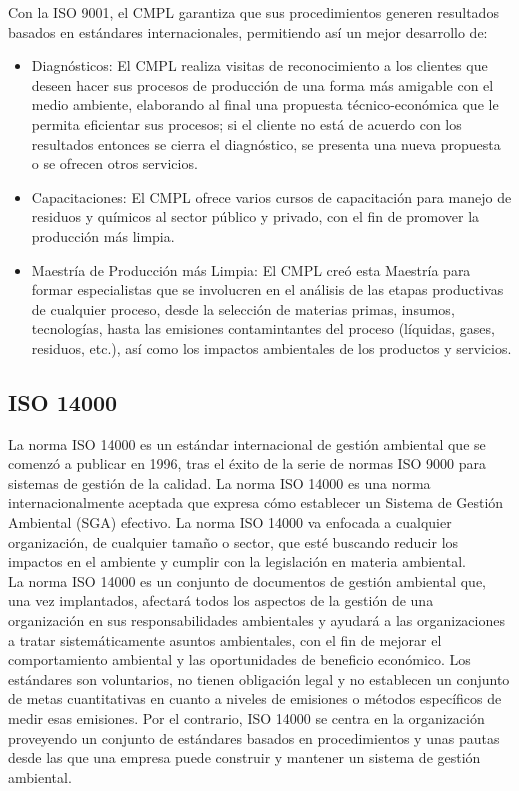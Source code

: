 	Con la ISO 9001, el CMPL garantiza que sus procedimientos generen resultados basados en estándares internacionales, permitiendo así un mejor desarrollo de:\\

	\begin{itemize}
		\item Diagnósticos: El CMPL realiza visitas de reconocimiento a los clientes que deseen hacer sus procesos de producción de una forma más amigable con el medio ambiente, elaborando al final una propuesta técnico-económica que le permita eficientar sus procesos; si el cliente no está de acuerdo con los resultados entonces se cierra el diagnóstico, se presenta una nueva propuesta o se ofrecen otros servicios.
		\item Capacitaciones: El CMPL ofrece varios cursos de capacitación para manejo de residuos y químicos al sector público y privado, con el fin de promover la producción más limpia.
		\item Maestría de Producción más Limpia: El CMPL creó esta Maestría para formar especialistas que se involucren en el análisis de las etapas productivas de cualquier proceso, desde la selección de materias primas, insumos, tecnologías, hasta las emisiones contamintantes del proceso (líquidas, gases, residuos, etc.), así como los impactos ambientales de los productos y servicios. \cite{CMPLWebPage}
	\end{itemize}
	
	\subsection{ISO 14000}
	La norma ISO 14000 es un estándar internacional de gestión ambiental que se comenzó a publicar en 1996, tras el éxito de la serie de normas ISO 9000 para sistemas de gestión de la calidad. La norma ISO 14000 es una norma internacionalmente aceptada que expresa cómo establecer un Sistema de Gestión Ambiental (SGA) efectivo. La norma ISO 14000 va enfocada a cualquier organización, de cualquier tamaño o sector, que esté buscando reducir los impactos en el ambiente y cumplir con la legislación en materia ambiental.\\
	
	La norma ISO 14000 es un conjunto de documentos de gestión ambiental que, una vez implantados, afectará todos los aspectos de la gestión de una organización en sus responsabilidades ambientales y ayudará a las organizaciones a tratar sistemáticamente asuntos ambientales, con el fin de mejorar el comportamiento ambiental y las oportunidades de beneficio económico. Los estándares son voluntarios, no tienen obligación legal y no establecen un conjunto de metas cuantitativas en cuanto a niveles de emisiones o métodos específicos de medir esas emisiones. Por el contrario, ISO 14000 se centra en la organización proveyendo un conjunto de estándares basados en procedimientos y unas pautas desde las que una empresa puede construir y mantener un sistema de gestión ambiental. \cite{ISO14000}\\
	
